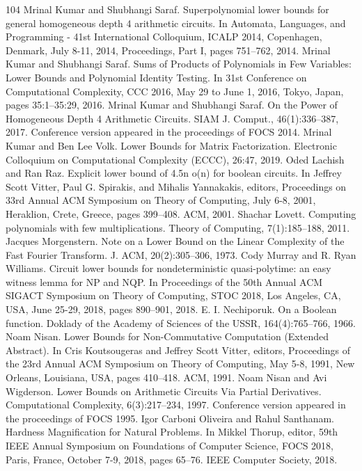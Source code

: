 \documentclass[10pt,a4paper]{article}
\begin{document}
\begin{thebibliography}{104}
 Mrinal Kumar and Shubhangi Saraf. Superpolynomial lower bounds for general homogeneous depth 4 arithmetic circuits. In Automata, Languages, and Programming - 41st International Colloquium, ICALP 2014, Copenhagen, Denmark, July 8-11, 2014, Proceedings, Part I, pages 751–762, 2014.
 Mrinal Kumar and Shubhangi Saraf. Sums of Products of Polynomials in Few Variables: Lower Bounds and Polynomial Identity Testing. In 31st Conference on Computational Complexity, CCC 2016, May 29 to June 1, 2016, Tokyo, Japan, pages 35:1–35:29, 2016.
 Mrinal Kumar and Shubhangi Saraf. On the Power of Homogeneous Depth 4 Arithmetic Circuits. SIAM J. Comput., 46(1):336–387, 2017. Conference version appeared in the proceedings of FOCS 2014.
 Mrinal Kumar and Ben Lee Volk. Lower Bounds for Matrix Factorization. Electronic Colloquium on Computational Complexity (ECCC), 26:47, 2019.
 Oded Lachish and Ran Raz. Explicit lower bound of 4.5n o(n) for boolean circuits. In Jeffrey Scott Vitter, Paul G. Spirakis, and Mihalis Yannakakis, editors, Proceedings on 33rd Annual ACM Symposium on Theory of Computing, July 6-8, 2001, Heraklion, Crete, Greece, pages 399–408. ACM, 2001.
 Shachar Lovett. Computing polynomials with few multiplications. Theory of Computing, 7(1):185–188, 2011.
 Jacques Morgenstern. Note on a Lower Bound on the Linear Complexity of the Fast Fourier Transform. J. ACM, 20(2):305–306, 1973.
 Cody Murray and R. Ryan Williams. Circuit lower bounds for nondeterministic quasi-polytime: an easy witness lemma for NP and NQP. In Proceedings of the 50th Annual ACM SIGACT Symposium on Theory of Computing, STOC 2018, Los Angeles, CA, USA, June 25-29, 2018, pages 890–901, 2018.
 E. I. Nechiporuk. On a Boolean function. Doklady of the Academy of Sciences of the USSR, 164(4):765–766, 1966.
 Noam Nisan. Lower Bounds for Non-Commutative Computation (Extended Abstract). In Cris Koutsougeras and Jeffrey Scott Vitter, editors, Proceedings of the 23rd Annual ACM Symposium on Theory of Computing, May 5-8, 1991, New Orleans, Louisiana, USA, pages 410–418. ACM, 1991.
 Noam Nisan and Avi Wigderson. Lower Bounds on Arithmetic Circuits Via Partial Derivatives. Computational Complexity, 6(3):217–234, 1997. Conference version appeared in the proceedings of FOCS 1995.
 Igor Carboni Oliveira and Rahul Santhanam. Hardness Magnification for Natural Problems. In Mikkel Thorup, editor, 59th IEEE Annual Symposium on Foundations of Computer Science, FOCS 2018, Paris, France, October 7-9, 2018, pages 65–76. IEEE Computer Society, 2018.

\end{thebibliography}
\end{document}
